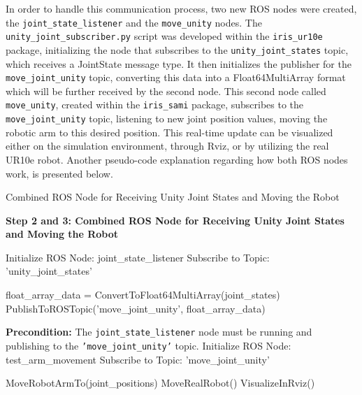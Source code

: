 In order to handle this communication process, two new \ac{ROS} nodes were created, the \texttt{joint\_state\_listener} and the \texttt{move\_unity} nodes. The \texttt{unity\_joint\_subscriber.py} script was developed within the \texttt{iris\_ur10e} package, initializing the node that subscribes to the \texttt{unity\_joint\_states} topic, which receives a JointState message type. It then initializes the publisher for the \texttt{move\_joint\_unity} topic, converting this data into a Float64MultiArray format which will be further received by the second node. This second node called \texttt{move\_unity}, created within the \texttt{iris\_sami} package, subscribes to the \texttt{move\_joint\_unity} topic, listening to new joint position values, moving the robotic arm to this desired position. This real-time update can be visualized either on the simulation environment, through Rviz, or by utilizing the real UR10e robot. Another pseudo-code explanation regarding how both \ac{ROS} nodes work, is presented below.


\begin{algorithm}
    \caption{Combined ROS Node for Receiving Unity Joint States and Moving the Robot}\label{alg:combined_ros_node}
    \begin{algorithmic}[1]
        \State \textbf{Step 2 and 3: Combined ROS Node for Receiving Unity Joint States and Moving the Robot}
        
        \State Initialize ROS Node: joint\_state\_listener
        \State Subscribe to Topic: 'unity\_joint\_states'
        
            \State float\_array\_data = ConvertToFloat64MultiArray(joint\_states)
            \State PublishToROSTopic('move\_joint\_unity', float\_array\_data)
        \EndWhile
        
        \State \textbf{Precondition:} The \texttt{joint\_state\_listener} node must be running and publishing to the \texttt{'move\_joint\_unity'} topic.
        \State Initialize ROS Node: test\_arm\_movement
        \State Subscribe to Topic: 'move\_joint\_unity'
        
            \State MoveRobotArmTo(joint\_positions)
                \State MoveRealRobot()
            \Else
                \State VisualizeInRviz()
            \EndIf
        \EndWhile
    \end{algorithmic}
\end{algorithm}


